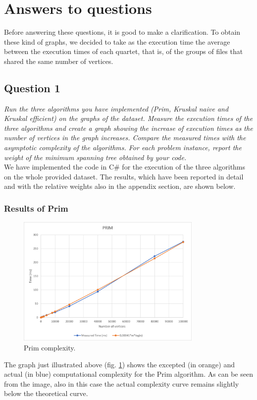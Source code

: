 \section{Answers to questions}

Before answering these questions, it is good to make a clarification. To obtain these kind of graphs, 
we decided to take as the execution time the average between the execution times of each quartet, that is, 
of the groups of files that shared the same number of vertices.

\subsection{Question 1}
\textit{Run the three algorithms you have implemented (Prim, Kruskal naive and Kruskal efficient) on the 
graphs of the dataset. Measure the execution times of the three algorithms and create a graph showing the 
increase of execution times as the number of vertices in the graph increases. Compare the measured times 
with the asymptotic complexity of the algorithms. For each problem instance, report the weight of the minimum 
spanning tree obtained by your code.} \\

\noindent
We have implemented the code in C\# for the execution of the three algorithms on the whole provided dataset. 
The results, which have been reported in detail and with the relative weights also in the appendix section, 
are shown below.

\subsubsection{Results of Prim}
\begin{figure}[H]
    \centering
    \includegraphics[width=0.8\textwidth]{../img/Prim.png}
    \caption{Prim complexity.}
    \label{fig:prim}
\end{figure}
The graph just illustrated above (fig. \ref{fig:prim}) shows the excepted (in orange) and actual (in blue) 
computational complexity for the Prim algorithm. As can be seen from the image, also in this case the actual 
complexity curve remains slightly below the theoretical curve.

